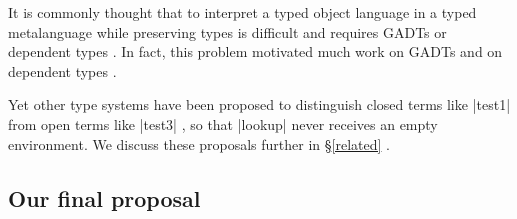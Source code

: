 \begin{comment}
\subsection{Solutions using fancier types}
\end{comment}

It is commonly thought that to interpret a typed object language in
a typed metalanguage while preserving types is difficult and requires
GADTs or dependent types \citep{taha-tag}.  In fact, this problem
motivated much work on GADTs \cite{xi-guarded,peyton-jones-simple} and
on dependent types \cite{WalidICFP02,fogarty-concoqtion}.
\begin{comment}
For a metalanguage's type system to allow the well-typed object term
|test1| but disallow the ill-typed object term |test2|, fancier types
such as GADTs or dependent types seem necessary.  
\end{comment}
Yet other type systems
have been proposed to distinguish closed terms like |test1| from open
terms like |test3|
\cite{WalidPOPL03,NanevskiJFP05,DaviesJACM01},
so that |lookup| never receives an empty environment.  We discuss these
proposals further in \S\ref{related}%
.
\begin{comment}
; here we just note that many
advanced type systems have been devised to ensure statically that an
object term is well-typed and closed.
\end{comment}

\subsection{Our final proposal}\label{ourapproach}

